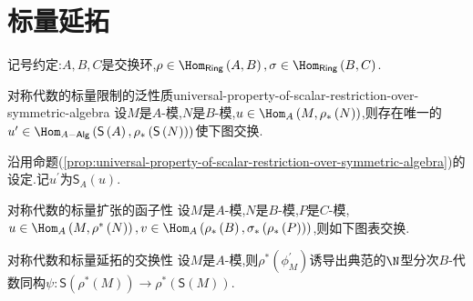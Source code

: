 \section{标量延拓}

记号约定:$A,B,C$是交换环,$\rho\in\Hom_{\mathsf{Ring}}\left(A,B\right),\sigma\in\Hom_{\mathsf{Ring}}\left(B,C\right)$.

\begin{proposition}{对称代数的标量限制的泛性质}{universal-property-of-scalar-restriction-over-symmetric-algebra}
	设$M$是$A$-模,$N$是$B$-模,$u\in\Hom_{A}\left(M,\rho_{\ast}\left(N\right)\right)$,则存在唯一的$u^{\prime}\in\Hom_{A-\mathsf{Alg}}\left(\mathsf{S}\left(A\right),\rho_{\ast}\left(\mathsf{S}\left(N\right)\right)\right)$使下图交换.
	\begin{center}
	\end{center}
\end{proposition}

\begin{definition}{}{}
	沿用命题(\ref{prop:universal-property-of-scalar-restriction-over-symmetric-algebra})的设定.记$u^{\prime}$为$\mathsf{S}_{A}\left(u\right)$.
\end{definition}

\begin{proposition}{对称代数的标量扩张的函子性}{}
	设$M$是$A$-模,$N$是$B$-模,$P$是$C$-模,$u\in\Hom_{A}\left(M,\rho^{\ast}\left(N\right)\right),v\in\Hom_{A}\left(\rho_{\ast}\left(B\right),\sigma_{\ast}\left(\rho_{\ast}\left(P\right)\right)\right)$,则如下图表交换.
	\begin{center}
	\end{center}
\end{proposition}

\begin{proposition}{对称代数和标量延拓的交换性}{}
	设$M$是$A$-模,则$\rho^{\ast}\left(\phi_{M}^{\prime}\right)$诱导出典范的$\N$型分次$B$-代数同构$\psi:\mathsf{S}\left(\rho^{\ast}\left(M\right)\right)\to\rho^{\ast}\left(\mathsf{S}\left(M\right)\right)$.
\end{proposition}